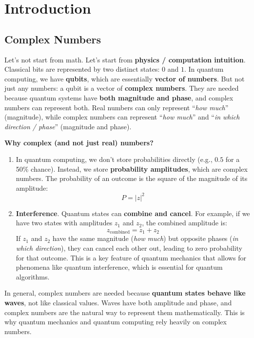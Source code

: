 \section{Introduction}

\subsection{Complex Numbers}

Let's not start from math. Let's start from \textbf{physics / computation intuition}. Classical bits are represented by two distinct states: $0$ and $1$. In quantum computing, we have \textbf{qubits}, which are essentially \textbf{vector of numbers}. But not just any numbers: a qubit is a vector of \textbf{complex numbers}. They are needed because quantum systems have \textbf{both magnitude and phase}, and complex numbers can represent both. Real numbers can only represent ``\emph{how much}'' (magnitude), while complex numbers can represent ``\emph{how much}'' and ``\emph{in which direction / phase}'' (magnitude and phase).

\highspace
\textcolor{Green3}{ \textbf{Why complex (and not just real) numbers?}}
\begin{enumerate}
    \item In quantum computing, we don't store probabilities directly (e.g., $0.5$ for a 50\% chance). Instead, we store \textbf{probability amplitudes}, which are complex numbers. The probability of an outcome is the square of the magnitude of its amplitude:
    \begin{equation}\label{eq:magnitude}
        P = \left|z\right|^2
    \end{equation}
    \item \textbf{Interference}. Quantum states can \textbf{combine and cancel}. For example, if we have two states with amplitudes $z_1$ and $z_2$, the combined amplitude is:
    \begin{equation*}
        z_{\text{combined}} = z_1 + z_2
    \end{equation*}
    If $z_1$ and $z_2$ have the same magnitude (\emph{how much}) but opposite phases (\emph{in which direction}), they can cancel each other out, leading to zero probability for that outcome. This is a key feature of quantum mechanics that allows for phenomena like quantum interference, which is essential for quantum algorithms.
\end{enumerate}
In general, complex numbers are needed because \textbf{quantum states behave like waves}, not like classical values. Waves have both amplitude and phase, and complex numbers are the natural way to represent them mathematically. This is why quantum mechanics and quantum computing rely heavily on complex numbers.

